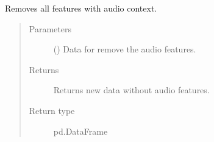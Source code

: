 \documentclass[letterpaper,10pt,english]{sphinxmanual}
\begin{document}

\begin{fulllineitems}
\label{\detokenize{anoog.io:anoog.io.data_io.remove_audio_features}}
\sphinxAtStartPar
Removes all features with audio context.
\begin{quote}\begin{description}
\item[{Parameters}] \leavevmode
\sphinxAtStartPar
{} () \textendash{} Data for remove the audio features.

\item[{Returns}] \leavevmode
\sphinxAtStartPar
Returns new data without audio features.

\item[{Return type}] \leavevmode
\sphinxAtStartPar
pd.DataFrame

\end{description}\end{quote}

\end{fulllineitems}

\end{document}

